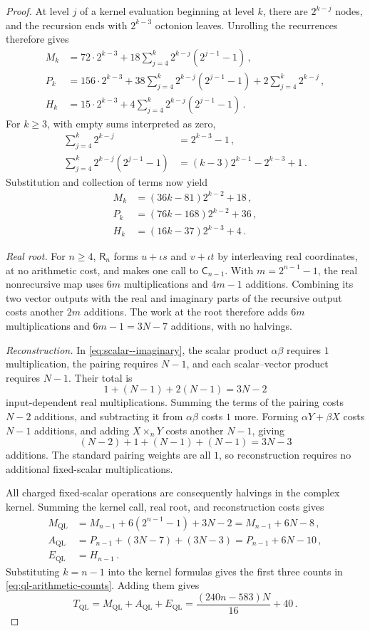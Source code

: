 \documentclass[11pt,reqno]{amsart}
\numberwithin{equation}{section}
\newcommand{\AltC}{\mathsf C}
\newcommand{\AltR}{\mathsf R}
\begin{document}
\begin{proof}
At level $j$ of a kernel evaluation beginning at level $k$, there are
$2^{k-j}$ nodes, and the recursion ends with $2^{k-3}$ octonion leaves.
Unrolling the recurrences therefore gives
\[
\begin{aligned}
M_k&=72\cdot2^{k-3}
 +18\sum_{j=4}^k2^{k-j}(2^{j-1}-1)\,,\\
P_k&=156\cdot2^{k-3}
 +38\sum_{j=4}^k2^{k-j}(2^{j-1}-1)
 +2\sum_{j=4}^k2^{k-j}\,,\\
H_k&=15\cdot2^{k-3}
 +4\sum_{j=4}^k2^{k-j}(2^{j-1}-1)\,.
\end{aligned}
\]
For $k\ge3$, with empty sums interpreted as zero,
\[
\begin{aligned}
\sum_{j=4}^k2^{k-j}&=2^{k-3}-1\,,\\
\sum_{j=4}^k2^{k-j}(2^{j-1}-1)
&=(k-3)2^{k-1}-2^{k-3}+1\,.
\end{aligned}
\]
Substitution and collection of terms now yield
\[
\begin{aligned}
M_k&=(36k-81)2^{k-2}+18\,,\\
P_k&=(76k-168)2^{k-2}+36\,,\\
H_k&=(16k-37)2^{k-3}+4\,.
\end{aligned}
\]

\emph{Real root.} For $n\ge4$, $\AltR_n$ forms $u+\iota s$ and
$v+\iota t$ by interleaving real coordinates, at no arithmetic cost, and
makes one call to $\AltC_{n-1}$. With $m=2^{n-1}-1$, the real nonrecursive map
uses $6m$ multiplications and $4m-1$ additions. Combining its two
vector outputs with the real and imaginary parts of the recursive
output costs another $2m$ additions. The work at the root therefore
adds $6m$ multiplications and $6m-1=3N-7$ additions, with no halvings.

\emph{Reconstruction.} In \eqref{eq:scalar--imaginary}, the scalar
product $\alpha\beta$ requires $1$ multiplication, the pairing requires
$N-1$, and each scalar--vector product requires $N-1$. Their total is
\[
1+(N-1)+2(N-1)=3N-2
\]
input-dependent real multiplications. Summing the terms of the pairing
costs $N-2$ additions, and subtracting it from $\alpha\beta$ costs $1$
more. Forming $\alpha Y+\beta X$ costs $N-1$ additions, and adding
$X\times_nY$ costs another $N-1$, giving
\[
(N-2)+1+(N-1)+(N-1)=3N-3
\]
additions. The standard pairing weights are all $1$, so reconstruction
requires no additional fixed-scalar multiplications.

All charged fixed-scalar operations are consequently halvings in the
complex kernel. Summing the kernel call, real root, and reconstruction
costs gives
\[
\begin{aligned}
M_{\mathrm{QL}}
&=M_{n-1}+6(2^{n-1}-1)+3N-2
 =M_{n-1}+6N-8\,,\\
A_{\mathrm{QL}}
&=P_{n-1}+(3N-7)+(3N-3)
 =P_{n-1}+6N-10\,,\\
E_{\mathrm{QL}}&=H_{n-1}\,.
\end{aligned}
\]
Substituting $k=n-1$ into the kernel formulas gives the first three
counts in \eqref{eq:ql-arithmetic-counts}. Adding them gives
\[
T_{\mathrm{QL}}=M_{\mathrm{QL}}+A_{\mathrm{QL}}+E_{\mathrm{QL}}
=\frac{(240n-583)N}{16}+40\,.
\]


\end{proof}
\end{document}
